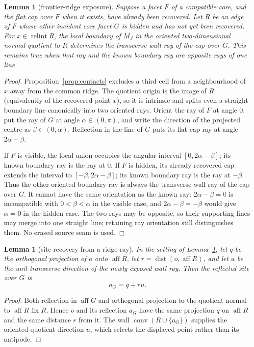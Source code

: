 \documentclass[11pt]{amsart}
\newtheorem{lemma}[theorem]{Lemma}
\theoremstyle{definition}
\newcommand{\conv}{\operatorname{conv}}
\newcommand{\aff}{\operatorname{aff}}
\newcommand{\relint}{\operatorname{relint}}
\newcommand{\dist}{\operatorname{dist}}
\begin{document}
\begin{lemma}[frontier-ridge exposure]
\label{lem:ridge-exposure}
Suppose a facet $F$ of a compatible core, and the flat cap over $F$ when it
exists, have already been recovered.  Let $R$ be an edge of $F$ whose other
incident core facet $G$ is hidden and has not yet been recovered.  For
$x\in\relint R$, the local boundary of $M_J$ in the oriented two-dimensional
normal quotient to $R$ determines the transverse wall ray of the cap over
$G$.  This remains true when that ray and the known boundary ray are opposite
rays of one line.
\end{lemma}

\begin{proof}
Proposition~\ref{prop:contacts} excludes a third cell from a neighbourhood of
$x$ away from the common ridge.  The quotient origin is the image of $R$
(equivalently of the recovered point $x$), so it is intrinsic and splits even
a straight boundary line canonically into two oriented rays.  Orient the ray
of $F$ at angle $0$, put the ray of $G$ at angle
$\alpha\in(0,\pi)$, and write the direction of the projected centre as
$\beta\in(0,\alpha)$.  Reflection in the line of $G$ puts its flat-cap ray at
angle $2\alpha-\beta$.

If $F$ is visible, the local union occupies the angular interval
$[0,2\alpha-\beta]$; its known boundary ray is the ray at $0$.  If $F$ is
hidden, its already recovered cap extends the interval to
$[-\beta,2\alpha-\beta]$; its known boundary ray is the ray at $-\beta$.
Thus the other oriented boundary ray is always the transverse wall ray of
the cap over $G$.  It cannot have the same orientation as the known ray:
$2\alpha-\beta=0$ is incompatible with $0<\beta<\alpha$ in the visible case,
and $2\alpha-\beta=-\beta$ would give $\alpha=0$ in the hidden case.  The two
rays may be opposite, so their supporting lines may merge into one straight
line; retaining ray orientation still distinguishes them.  No erased source
seam is used.
\end{proof}

\begin{lemma}[site recovery from a ridge ray]
\label{lem:ridge-site}
In the setting of Lemma~\ref{lem:ridge-exposure}, let $q$ be the orthogonal
projection of $o$ onto $\aff R$, let $r=\dist(o,\aff R)$, and let $u$ be the
unit transverse direction of the newly exposed wall ray.  Then the reflected
site over $G$ is
\[
 a_G=q+ru.
\]
\end{lemma}

\begin{proof}
Both reflection in $\aff G$ and orthogonal projection to the quotient normal
to $\aff R$ fix $R$.  Hence $o$ and its reflection $a_G$ have the same
projection $q$ on $\aff R$ and the same distance $r$ from it.  The wall
$\conv(R\cup\{a_G\})$ supplies the oriented quotient direction $u$, which
selects the displayed point rather than its antipode.
\end{proof}
\end{document}
